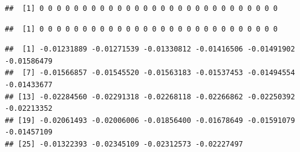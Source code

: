 \documentclass[
]{krantz}
\makeatletter
\newenvironment{Shaded}{\begin{snugshade}}{\end{snugshade}}
\newcommand{\DataTypeTok}[1]{\textcolor[rgb]{0.13,0.29,0.53}{#1}}
\newcommand{\DecValTok}[1]{\textcolor[rgb]{0.00,0.00,0.81}{#1}}
\newcommand{\FloatTok}[1]{\textcolor[rgb]{0.00,0.00,0.81}{#1}}
\newcommand{\KeywordTok}[1]{\textcolor[rgb]{0.13,0.29,0.53}{\textbf{#1}}}
\newcommand{\NormalTok}[1]{#1}
\newcommand{\OperatorTok}[1]{\textcolor[rgb]{0.81,0.36,0.00}{\textbf{#1}}}
\newcommand{\StringTok}[1]{\textcolor[rgb]{0.31,0.60,0.02}{#1}}
\newenvironment{kframe}{%
\medskip{}
\setlength{\fboxsep}{.8em}
 \def\at@end@of@kframe{}%
 \ifinner\ifhmode%
  \def\at@end@of@kframe{\end{minipage}}%
  \begin{minipage}{\columnwidth}%
 \fi\fi%
 \def\FrameCommand##1{\hskip\@totalleftmargin \hskip-\fboxsep
 \colorbox{shadecolor}{##1}\hskip-\fboxsep
     \hskip-\linewidth \hskip-\@totalleftmargin \hskip\columnwidth}%
 \MakeFramed {\advance\hsize-\width
   \@totalleftmargin\z@ \linewidth\hsize
   \@setminipage}}%
 {\par\unskip\endMakeFramed%
 \at@end@of@kframe}
\renewenvironment{Shaded}{\begin{kframe}}{\end{kframe}}
\makeatother
\begin{document}
\begin{Shaded}
\end{Shaded}

\begin{verbatim}
##  [1] 0 0 0 0 0 0 0 0 0 0 0 0 0 0 0 0 0 0 0 0 0 0 0 0 0 0 0 0
\end{verbatim}

\begin{Shaded}
\end{Shaded}

\begin{verbatim}
##  [1] 0 0 0 0 0 0 0 0 0 0 0 0 0 0 0 0 0 0 0 0 0 0 0 0 0 0 0 0
\end{verbatim}

\begin{Shaded}
\end{Shaded}

\begin{verbatim}
##  [1] -0.01231889 -0.01271539 -0.01330812 -0.01416506 -0.01491902 -0.01586479
##  [7] -0.01566857 -0.01545520 -0.01563183 -0.01537453 -0.01494554 -0.01433677
## [13] -0.02284560 -0.02291318 -0.02268118 -0.02266862 -0.02250392 -0.02213352
## [19] -0.02061493 -0.02006006 -0.01856400 -0.01678649 -0.01591079 -0.01457109
## [25] -0.01322393 -0.02345109 -0.02312573 -0.02227497
\end{verbatim}

\begin{Shaded}
\end{Shaded}
\end{document}
